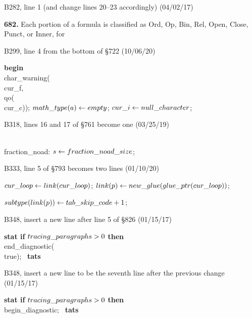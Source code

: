 \bugonpage B282, line 1 {(and change lines 20--23 accordingly)} (04/02/17)

\tenpoint\noindent
{\bf 682.} Each portion of a formula is classified as Ord, Op, Bin, Rel, Open,
Close, Punct, or Inner, for\cutpar

\bugonpage B299, line 4 from the bottom of \S722 (10/06/20)

\ninepoint\noindent\qquad\quad
{\bf begin} \\{char\_warning}(\\{cur\_f}, \\{qo}(\\{cur\_c}));
$\\{math\_type}(a)\gets\\{empty}$;
$\\{cur\_i}\gets\\{null\_character}$;

\bugonpage B318, lines 16 and 17 of \S761 become one (03/25/19)

\ninepoint\noindent
\\{fraction\_noad}: $s\gets\\{fraction\_noad\_size}$;

\bugonpage B333, line 5 of \S793 becomes two lines (01/10/20)

\ninepoint\noindent\quad
$\\{cur\_loop}\gets\\{link}(\\{cur\_loop})$;
$\\{link}(p)\gets\\{new\_glue}(\\{glue\_ptr}(\\{cur\_loop}))$;\par
\noindent\quad
$\\{subtype}(\\{link}(p))\gets\\{tab\_skip\_code}+1$;

\bugonpage B348, insert a new line after line 5 of \S826 (01/15/17)

\ninepoint\noindent\qquad
{\bf stat if} $\\{tracing\_paragraphs}>0$ {\bf then}
\\{end\_diagnostic}(\\{true}); \ {\bf tats}

\bugonpage B348, insert a new line to be the seventh line after the previous change (01/15/17)

\ninepoint\noindent\qquad
{\bf stat if} $\\{tracing\_paragraphs}>0$ {\bf then}
\\{begin\_diagnostic}; \ {\bf tats}

